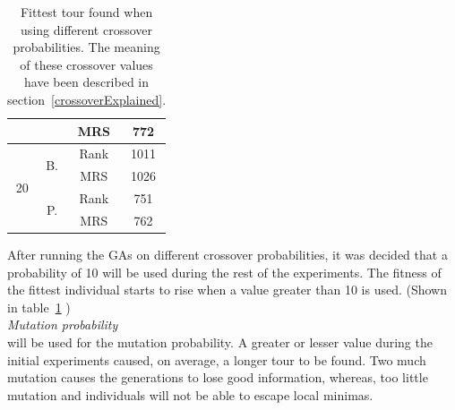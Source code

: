 \documentclass[10pt,a4paper,openbib]{article}
\begin{document}
\begin{multicols}{2}
\begin{table}[H]
\begin{tabular}{|c|c|c|c|}
                                         &                                    & MRS                                & 772                                   \\ \hline
\multirow{4}{*}{20}                      & \multirow{2}{*}{B.}                & Rank                               & 1011                                  \\ \cline{3-4} 
                                         &                                    & MRS                                & 1026                                  \\ \cline{2-4} 
                                         & \multirow{2}{*}{P.}                & Rank                               & 751                                   \\ \cline{3-4} 
                                         &                                    & MRS                                & 762                                   \\ \hline
\end{tabular}
\caption{Fittest tour found when using different crossover probabilities. The meaning of these crossover values have been described in section~\ref{crossoverExplained}.}
\label{table:crossover20cities}
\end{table}

\noindent After running the GAs on different crossover probabilities, it was decided that a probability of 10 will be used during the rest of the experiments. The fitness of the fittest individual starts to rise when a value greater than 10 is used. (Shown in table~\ref{table:crossover20cities} )\\

\noindent \textit{Mutation probability} \\

 will be used for the mutation probability. A greater or lesser value during the initial experiments caused, on average, a longer tour to be found. Two much mutation causes the generations to lose good information, whereas, too little mutation and individuals will not be able to escape local minimas. \\


\end{multicols}
\end{document}
